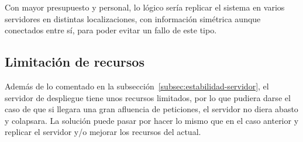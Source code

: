 Con mayor presupuesto y personal, lo lógico sería replicar el sistema en
varios servidores en distintas localizaciones, con información simétrica aunque
conectados entre sí, para poder evitar un fallo de este tipo.

\subsection{Limitación de recursos}

Además de lo comentado en la subsección~\ref{subsec:estabilidad-servidor},
el servidor de despliegue tiene unos recursos limitados, por lo que pudiera
darse el caso de que si llegara una gran afluencia de peticiones, el servidor
no diera abasto y colapsara. La solución puede pasar por hacer lo mismo que en
el caso anterior y replicar el servidor y/o mejorar los recursos del actual.
